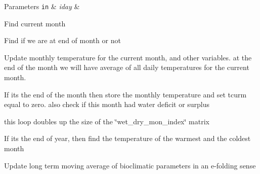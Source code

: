 \begin{DoxyParams}[1]{Parameters}
\mbox{\tt in}  & {\em iday} & \\
\hline
\end{DoxyParams}
Find current month

Find if we are at end of month or not

Update monthly temperature for the current month, and other variables. at the end of the month we will have average of all daily temperatures for the current month.

If its the end of the month then store the monthly temperature and set tcurm equal to zero. also check if this month had water deficit or surplus

this loop doubles up the size of the \char`\"{}wet\+\_\+dry\+\_\+mon\+\_\+index\char`\"{} matrix

If its the end of year, then find the temperature of the warmest and the coldest month

Update long term moving average of bioclimatic parameters in an e-\/folding sense 
